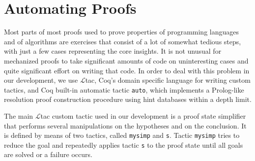 \section{Automating Proofs}\label{tactics}

Most parts of most proofs used to prove properties of programming
languages and of algorithms are exercises that consist of a lot of
somewhat tedious steps, with just a few cases representing the core
insights. It is not unusual for mechanized proofs to take significant
amounts of code on uninteresting cases and quite significant effort on
writing that code. In order to deal with this problem in our
development, we use $\mathcal{L}$tac, Coq's domain specific language
for writing custom tactics, and Coq built-in automatic tactic
\texttt{auto}, which implements a Prolog-like resolution proof
construction procedure using hint databases within a depth limit.

The main $\mathcal{L}$tac custom tactic used in our development is a
proof state simplifier that performs several manipulations on the
hypotheses and on the conclusion. It is defined by means of two
tactics, called \texttt{mysimp} and \texttt{s}. Tactic \texttt{mysimp}
tries to reduce the goal and repeatedly applies tactic \texttt{s} to
the proof state until all goals are solved or a failure occurs. 

